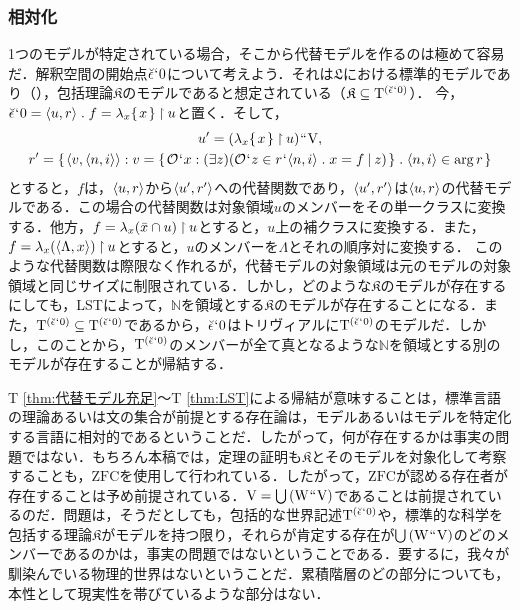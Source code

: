 \subsubsection{相対化}
\label{sssec:相対化}

1つのモデルが特定されている場合，そこから代替モデルを作るのは極めて容易だ．解釈空間の開始点$\breve{\epsilon}{\mspace{1mu}{`}\mspace{1mu}} 0 $について考えよう．それは$\mathfrak{L}$における標準的モデルであり（），包括理論$\mathfrak{K}$のモデルであると想定されている（$ \mathfrak{K}\subseteq \mathrm{T}^{(\breve{\epsilon}{\mspace{1mu}{`}\mspace{1mu}} 0)} $）．
今，$\breve{\epsilon}\fap 0 = \orp{u,r}\con{1}f = \lambda_x\classab{x}\uphr u$と置く．そして，
\begin{gather*}
    u' = (\lambda_x\classab{x}\uphr u)\img\univ,\\
    r' = \classab{\orp{v,\orp{n,i}}:
        v = \classab{\mathcal{O}\fap x:
            (\exists z)(
                \mathcal{O}\fap z\in r\fap \orp{n,i}\con{1}x = f\resl z
            )
        }\con{1}\orp{n,i}\in\arg r
    }
\end{gather*}
とすると，$f$は，$\langle u,r \rangle$から$\langle u',r' \rangle$への代替関数であり，$\langle u',r' \rangle$は$\langle u,r \rangle$の代替モデルである．この場合の代替関数は対象領域$ u $のメンバーをその単一クラスに変換する．他方，$ f = \lambda_x(\bar{x}\cap u)\mathbin{\upharpoonright} u $とすると，$u$上の補クラスに変換する．また，$ f = \lambda_x(\langle \Lambda,x \rangle)\mathbin{\upharpoonright} u $とすると，$u$のメンバーを$\Lambda$とそれの順序対に変換する．
このような代替関数は際限なく作れるが，代替モデルの対象領域は元のモデルの対象領域と同じサイズに制限されている．しかし，どのような$\mathfrak{K}$のモデルが存在するにしても，LSTによって，$\mathbb{N}$を領域とする$\mathfrak{K}$のモデルが存在することになる．また，$\mathrm{T}^{(\breve{\epsilon}{\mspace{1mu}{`}\mspace{1mu}} 0)}\subseteq \mathrm{T}^{(\breve{\epsilon}{\mspace{1mu}{`}\mspace{1mu}} 0)}$であるから，$ \breve{\epsilon}{\mspace{1mu}{`}\mspace{1mu}} 0 $はトリヴィアルに$\mathrm{T}^{(\breve{\epsilon}{\mspace{1mu}{`}\mspace{1mu}} 0)}$のモデルだ．しかし，このことから，$\mathrm{T}^{(\breve{\epsilon}{\mspace{1mu}{`}\mspace{1mu}} 0)}$のメンバーが全て真となるような$\mathbb{N}$を領域とする別のモデルが存在することが帰結する．

T \ref{thm:代替モデル充足}〜T \ref{thm:LST}による帰結が意味することは，標準言語の理論あるいは文の集合が前提とする存在論は，モデルあるいはモデルを特定化する言語に相対的であるということだ．したがって，何が存在するかは事実の問題ではない．もちろん本稿では，定理の証明も$\mathfrak{K}$とそのモデルを対象化して考察することも，$\mathrm{ZFC}$を使用して行われている．したがって，$\mathrm{ZFC}$が認める存在者が存在することは予め前提されている．$\mathrm{V} = {\textstyle\bigcup}\mspace{3mu}(\mathrm{W}{\mspace{1mu}{``}\mspace{1mu}}\mathrm{V})$であることは前提されているのだ．問題は，そうだとしても，包括的な世界記述$\mathrm{T}^{(\breve{\epsilon}{\mspace{1mu}{`}\mspace{1mu}} 0)}$や，標準的な科学を包括する理論$\mathfrak{K}$がモデルを持つ限り，それらが肯定する存在が${\textstyle\bigcup}\mspace{3mu}(\mathrm{W}{\mspace{1mu}{``}\mspace{1mu}}\mathrm{V})$のどのメンバーであるのかは，事実の問題ではないということである．要するに，我々が馴染んでいる物理的世界はないということだ．累積階層のどの部分についても，本性として現実性を帯びているような部分はない．

